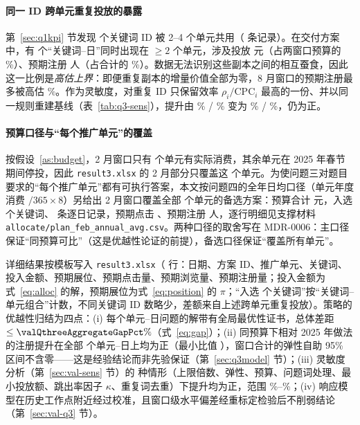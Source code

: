
\paragraph{同一 ID 跨单元重复投放的暴露}
第~\ref{sec:q1kpi} 节发现 \valSharedKeywordIds{} 个关键词 ID 被 2--4 个单元共用（\valSharedKeywordRows{} 条记录）。在交付方案中，有 \valQthreeDupKeywordDays{} 个“关键词--日”同时出现在 $\ge 2$ 个单元，涉及投放 \valQthreeDupSpend{} 元（占两窗口预算的 \valQthreeDupSpendSharePct\%）、预期注册 \valQthreeDupRegs{} 人（占合计的 \valQthreeDupRegsSharePct\%）。数据无法识别这些副本之间的相互蚕食，因此这一比例是\emph{高估上界}：即便重复副本的增量价值全部为零，8 月窗口的预期注册最多被高估 \valQthreeDupRegsSharePct\%。作为灵敏度，对重复 ID 只保留效率 $\rho_i/\mathrm{CPC}_i$ 最高的一份、并以同一规则重建基线（表~\ref{tab:q3-sens}），提升由 \valQthreeRegGainPctFeb\% / \valQthreeRegGainPctAug\% 变为 \valQthreeDupBestGainPctFeb\% / \valQthreeDupBestGainPctAug\%，仍为正。

\paragraph{预算口径与“每个推广单元”的覆盖}
按假设~\ref{as:budget}，2 月窗口只有 \valQthreeUnitsFeb{} 个单元有实际消费，其余单元在 2025 年春节期间停投，因此 \texttt{result3.xlsx} 的 2 月部分只覆盖这 \valQthreeUnitsFeb{} 个单元。为使问题三对题目要求的“每个推广单元”都有可执行答案，本文按问题四的全年日均口径（单元年度消费 $/365\times 8$）另给出 2 月窗口覆盖全部 \valQthreeFebAltUnits{} 个单元的备选方案：预算合计 \valQthreeFebAltBudget{} 元，入选 \valQthreeFebAltKeywords{} 个关键词、\valQthreeFebAltRows{} 条逐日记录，预期点击 \valQthreeFebAltClicks、预期注册 \valQthreeFebAltRegs{} 人，逐行明细见支撑材料 \texttt{allocate/plan\_feb\_annual\_avg.csv}。两种口径的取舍写在 MDR-0006：主口径保证“同预算可比”（这是优越性论证的前提），备选口径保证“覆盖所有单元”。

详细结果按模板写入 \texttt{result3.xlsx}（\valQthreeRows{} 行：日期、方案 ID、推广单元、关键词、投入金额、预期展位、预期点击量、预期浏览量、预期注册量；投入金额为式~\eqref{eq:alloc} 的解，预期展位为式~\eqref{eq:position} 的 $\pi$；“入选 \valQthreeSelectedKeywordsAug{} 个关键词”按“关键词--单元组合”计数，不同关键词 ID 数略少，差额来自上述跨单元重复投放）。策略的优越性归结为四点：(i) 每个单元--日问题的解带有全局最优性证书，总体差距 $\le\valQthreeAggregateGapPct\%$（式~\eqref{eq:gap}）；(ii) 同预算下相对 2025 年做法的注册提升在全部 \valQthreeUnitDaysOptAtLeastProp{} 个单元--日上均为正（最小比值 \valQthreeMinOptPropRatio），窗口合计的弹性自助 95\% 区间不含零——这是经验结论而非先验保证（第~\ref{sec:q3model} 节）；(iii) 灵敏度分析（第~\ref{sec:val-sens} 节）的 \valQthreeSensScenarios{} 种情形（上限倍数、弹性、预算、问题词处理、最小投放额、跳出率因子 $\kappa$、重复词去重）下提升均为正，范围 \valQthreeSensMinGainPct\%--\valQthreeSensMaxGainPct\%；(iv) 响应模型在历史工作点附近经过校准，且窗口级水平偏差经重标定检验后不削弱结论（第~\ref{sec:val-q3} 节）。
